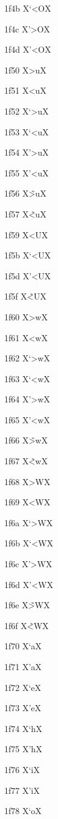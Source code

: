 \documentclass[11pt]{article}
\begin{document}
1f4b X{\textgreek{`<O}}X

1f4c X{\textgreek{'>O}}X

1f4d X{\textgreek{'<O}}X

1f50 X{\textgreek{>u}}X

1f51 X{\textgreek{<u}}X

1f52 X{\textgreek{`>u}}X

1f53 X{\textgreek{`<u}}X

1f54 X{\textgreek{'>u}}X

1f55 X{\textgreek{'<u}}X

1f56 X{\textgreek{\~{>u}}}X

1f57 X{\textgreek{\~{<u}}}X

1f59 X{\textgreek{<U}}X

1f5b X{\textgreek{`<U}}X

1f5d X{\textgreek{'<U}}X

1f5f X{\textgreek{\~{<U}}}X

1f60 X{\textgreek{>w}}X

1f61 X{\textgreek{<w}}X

1f62 X{\textgreek{`>w}}X

1f63 X{\textgreek{`<w}}X

1f64 X{\textgreek{'>w}}X

1f65 X{\textgreek{'<w}}X

1f66 X{\textgreek{\~{>w}}}X

1f67 X{\textgreek{\~{<w}}}X

1f68 X{\textgreek{>W}}X

1f69 X{\textgreek{<W}}X

1f6a X{\textgreek{`>W}}X

1f6b X{\textgreek{`<W}}X

1f6c X{\textgreek{'>W}}X

1f6d X{\textgreek{'<W}}X

1f6e X{\textgreek{\~{>W}}}X

1f6f X{\textgreek{\~{<W}}}X

1f70 X{\textgreek{`a}}X

1f71 X{\textgreek{'a}}X

1f72 X{\textgreek{`e}}X

1f73 X{\textgreek{'e}}X

1f74 X{\textgreek{`h}}X

1f75 X{\textgreek{'h}}X

1f76 X{\textgreek{`i}}X

1f77 X{\textgreek{'i}}X

1f78 X{\textgreek{`o}}X
\end{document}
